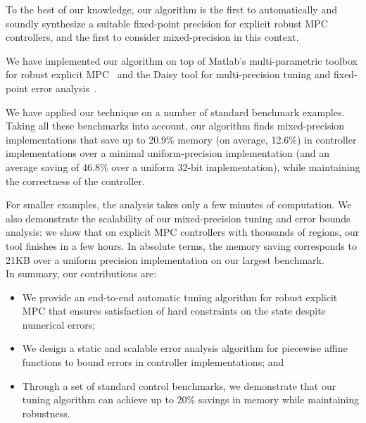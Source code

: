 To the best of our knowledge, our algorithm is the first to automatically and soundly
synthesize a suitable fixed-point precision for explicit robust MPC controllers,
and the first to consider mixed-precision in this context.

We have implemented our algorithm on top of Matlab's multi-parametric toolbox 
for robust explicit MPC~\cite{matlabMPT}
and the Daisy tool for multi-precision tuning and fixed-point error analysis~\cite{Daisy}. %

We have applied our technique on a number of standard benchmark examples. Taking all these benchmarks into account,
our algorithm finds mixed-precision implementations that save up to 20.9\%
memory (on average, 12.6\%) in controller implementations over a minimal
uniform-precision implementation (and an average saving of 46.8\% over a uniform
32-bit implementation), while maintaining the correctness of the controller.

For smaller examples, the analysis takes only a few minutes of computation.
We also demonstrate the scalability of our mixed-precision tuning and error bounds analysis:
we show that on explicit MPC controllers with thousands of regions, our tool finishes in a few hours.
In absolute terms, the memory saving corresponds to 21KB over a uniform
precision implementation on our largest benchmark. %
\\
In summary, our contributions are:
\begin{itemize}
\item We provide an end-to-end automatic tuning algorithm for robust explicit MPC that ensures satisfaction of
hard constraints on the state despite numerical errors;
\item We design a static and scalable error analysis algorithm for piecewise affine functions to bound
errors in controller implementations; and
\item Through a set of standard control benchmarks, we demonstrate that our tuning algorithm
can achieve up to 20\% savings in memory while maintaining robustness.
\end{itemize} 


